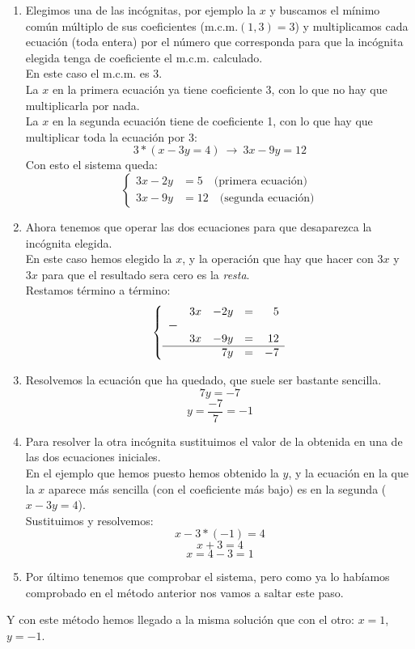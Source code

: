 \documentclass[a4paper,11pt,answers]{exam}
\begin{document}
  \begin{enumerate}
  \item Elegimos una de las incógnitas, por ejemplo la $x$ y buscamos el mínimo común múltiplo de sus coeficientes (m.c.m.$(1, 3) = 3$) y multiplicamos cada ecuación (toda entera) por el número que corresponda para que la incógnita elegida tenga de coeficiente el m.c.m. calculado.\\
    En este caso el m.c.m. es 3.\\
    La $x$ en la primera ecuación ya tiene coeficiente 3, con lo que no hay que multiplicarla por nada.\\
    La $x$ en la segunda ecuación tiene de coeficiente 1, con lo que hay que multiplicar toda la ecuación por 3: \[3*(x-3y = 4)\ \rightarrow\ 3x - 9y = 12\]
    Con esto el sistema queda:
    \[\begin{cases}
      3x-2y&=5 \quad \text{(primera ecuación)}\\
      3x-9y &= 12 \quad \text{(segunda ecuación)}
      \end{cases}\]
  \item Ahora tenemos que operar las dos ecuaciones para que desaparezca la incógnita elegida.\\
    En este caso hemos elegido la $x$, y la operación que hay que hacer con $3x$ y $3x$ para que el resultado sera cero es la \textit{resta}.\\
    Restamos término a término:
    \[\left\lbrace
        \begin{array}{rrrrr}
          &3x&-2y&=&5\\
          \boldsymbol{-}&&&&\\
          &3x&-9y&=&12\\
          \hline
          &&7y&=&-7
        \end{array}
      \right.
    \]

  \item Resolvemos la ecuación que ha quedado, que suele ser bastante sencilla.
    \[7y = -7\]
    \[y = \frac{-7}{7} = -1\]

  \item Para resolver la otra incógnita sustituimos el valor de la obtenida en una de las dos ecuaciones iniciales.\\
    En el ejemplo que hemos puesto hemos obtenido la $y$, y la ecuación en la que la $x$ aparece más sencilla (con el coeficiente más bajo) es en la segunda ($x - 3y = 4$).\\
    Sustituimos y resolvemos:
    \[x- 3*(-1) = 4\]
    \[x+3 = 4\]
    \[x = 4 - 3 = 1\]
  \item Por último tenemos que comprobar el sistema, pero como ya lo habíamos comprobado en el método anterior nos vamos a saltar este paso.
    
  \end{enumerate}
  Y con este método hemos llegado a la misma solución que con el otro: $x=1$, $y=-1$.
\end{document}
